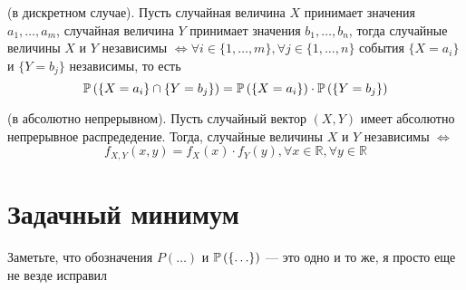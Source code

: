 \documentclass{article}
\begin{document}
\theorem (в дискретном случае). Пусть случайная величина $X$ принимает значения $a_1,\ldots,a_m$, случайная величина $Y$ принимает значения $b_1,\ldots,b_n$, тогда случайные величины $X$ и $Y$ независимы $\Longleftrightarrow \forall i\in\{1,\ldots,m\},\forall j\in\{1,\ldots,n\}$ события $\{X=a_i\}$ и $\{Y=b_j\}$ независимы, то есть
\begin{equation*}
    \mathbb{P}\left(\{X=a_i\}\cap\{Y=b_j\}\right)=\mathbb{P}\left(\{X=a_i\}\right)\cdot\mathbb{P}\left(\{Y=b_j\}\right)
\end{equation*}

\theorem (в абсолютно непрерывном). Пусть случайный вектор $(X,Y)$ имеет абсолютно непрерывное распредедение. Тогда, случайные величины $X$ и $Y$ независимы $\Longleftrightarrow$
\begin{equation*}
    f_{X,Y}(x,y)=f_X(x)\cdot f_{Y}(y),\forall x\in\mathbb{R},\forall y\in\mathbb{R}
\end{equation*}

    



\newpage
\section{Задачный минимум}
Заметьте, что обозначения $P(\ldots)$ и $\mathbb{P}\left(\{\ldots\}\right)$ — это одно и то же, я просто еще не везде исправил
    
    
\end{document}
